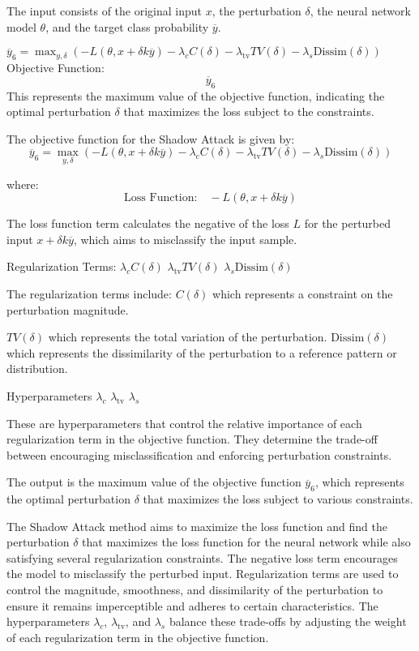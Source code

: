 The input consists of the original input $x$, the perturbation $\delta$, the neural network model $\theta$, and the target class probability $\overline{y}$. 

$\overline{y}_6 = \max_{y, \delta} \left( -L(\theta, x + \delta k \overline{y}) - \lambda_c C(\delta) - \lambda_{\text{tv}} TV(\delta) - \lambda_s \text{Dissim}(\delta) \right)$
Objective Function:
\begin{equation*}
\overline{y}_6
\end{equation*}
This represents the maximum value of the objective function, indicating the optimal perturbation \(\delta\) that maximizes the loss subject to the constraints.

The objective function for the Shadow Attack is given by:
\begin{equation*}
\overline{y}_6 = \max_{y, \delta} \left( -L(\theta, x + \delta k \overline{y}) - \lambda_c C(\delta) - \lambda_{\text{tv}} TV(\delta) - \lambda_s \text{Dissim}(\delta) \right)
\end{equation*}

where:
\begin{equation*}
\text{Loss Function:} \quad -L(\theta, x + \delta k \overline{y})
\end{equation*}

The loss function term calculates the negative of the loss $L$ for the perturbed input $x + \delta k \overline{y}$, which aims to misclassify the input sample.

Regularization Terms:
$\lambda_c C(\delta)$
$\lambda_{\text{tv}} TV(\delta)$
$\lambda_s \text{Dissim}(\delta)$


The regularization terms include:
$C(\delta)$
which represents a constraint on the perturbation magnitude.

$TV(\delta)$
which represents the total variation of the perturbation.
$\text{Dissim}(\delta)$which represents the dissimilarity of the perturbation to a reference pattern or distribution.

Hyperparameters
$\lambda_c$
$\lambda_{\text{tv}}$ 
$\lambda_s$

These are hyperparameters that control the relative importance of each regularization term in the objective function. They determine the trade-off between encouraging misclassification and enforcing perturbation constraints.

The output is the maximum value of the objective function $\overline{y}_6$, which represents the optimal perturbation $\delta$ that maximizes the loss subject to various constraints.

The Shadow Attack method aims to maximize the loss function and find the perturbation $\delta$ that maximizes the loss function for the neural network while also satisfying several regularization constraints. The negative loss term encourages the model to misclassify the perturbed input. Regularization terms are used to control the magnitude, smoothness, and dissimilarity of the perturbation to ensure it remains imperceptible and adheres to certain characteristics. The hyperparameters $\lambda_c$, $\lambda_{\text{tv}}$, and $\lambda_s$ balance these trade-offs by adjusting the weight of each regularization term in the objective function.
